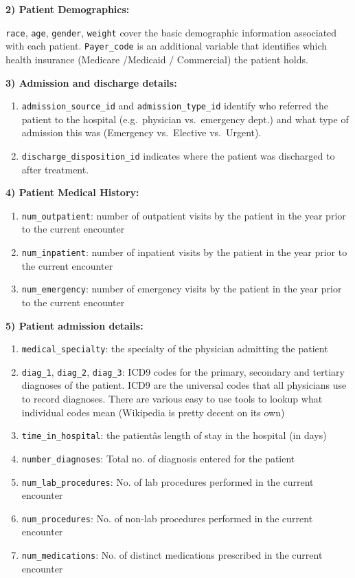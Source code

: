 \documentclass[]{article}
\providecommand{\tightlist}{%
  \setlength{\itemsep}{0pt}\setlength{\parskip}{0pt}}
\begin{document}
\textbf{2) Patient Demographics:}

\texttt{race}, \texttt{age}, \texttt{gender}, \texttt{weight} cover the
basic demographic information associated with each patient.
\texttt{Payer\_code} is an additional variable that identifies which
health insurance (Medicare /Medicaid / Commercial) the patient holds.

\textbf{3) Admission and discharge details:}

\begin{enumerate}
\def\labelenumi{\alph{enumi}.}
\tightlist
\item
  \texttt{admission\_source\_id} and \texttt{admission\_type\_id}
  identify who referred the patient to the hospital (e.g.~physician
  vs.~emergency dept.) and what type of admission this was (Emergency
  vs.~Elective vs.~Urgent).
\item
  \texttt{discharge\_disposition\_id} indicates where the patient was
  discharged to after treatment.
\end{enumerate}

\textbf{4) Patient Medical History:}

\begin{enumerate}
\def\labelenumi{\alph{enumi}.}
\tightlist
\item
  \texttt{num\_outpatient}: number of outpatient visits by the patient
  in the year prior to the current encounter
\item
  \texttt{num\_inpatient}: number of inpatient visits by the patient in
  the year prior to the current encounter
\item
  \texttt{num\_emergency}: number of emergency visits by the patient in
  the year prior to the current encounter
\end{enumerate}

\textbf{5) Patient admission details:}

\begin{enumerate}
\def\labelenumi{\alph{enumi}.}
\tightlist
\item
  \texttt{medical\_specialty}: the specialty of the physician admitting
  the patient
\item
  \texttt{diag\_1}, \texttt{diag\_2}, \texttt{diag\_3}: ICD9 codes for
  the primary, secondary and tertiary diagnoses of the patient. ICD9 are
  the universal codes that all physicians use to record diagnoses. There
  are various easy to use tools to lookup what individual codes mean
  (Wikipedia is pretty decent on its own)
\item
  \texttt{time\_in\_hospital}: the patientâs length of stay in the
  hospital (in days)
\item
  \texttt{number\_diagnoses}: Total no. of diagnosis entered for the
  patient
\item
  \texttt{num\_lab\_procedures}: No. of lab procedures performed in the
  current encounter
\item
  \texttt{num\_procedures}: No. of non-lab procedures performed in the
  current encounter
\item
  \texttt{num\_medications}: No. of distinct medications prescribed in
  the current encounter
\end{enumerate}
\end{document}
